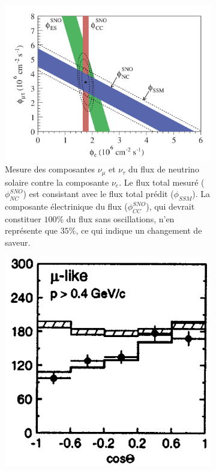             \begin{figure}[htbp]
                \begin{subfigure}[t]{0.56\textwidth}
                    \includegraphics[width=\textwidth]{Chapitre_1/pictures/SNO_plot.png}
                    \caption{Mesure des composantes $\nu_{\mu}$ et $\nu_{\tau}$ du flux de neutrino solaire contre la composante $\nu_e$\cite{Aharmim2013}. Le flux total mesuré ($\phi_{NC}^{SNO}$) est consistant avec le flux total prédit ($\phi_{SSM}$). La composante électrinique du flux ($\phi_{CC}^{SNO}$), qui devrait constituer $100\%$ du flux sans oscillations, n'en représente que $35\%$, ce qui indique un changement de saveur.}
                    \label{fig::SNO_plot}
                \end{subfigure}
                \hfill 
                \begin{subfigure}[t]{0.4\textwidth}
                    \includegraphics[width=\textwidth]{Chapitre_1/pictures/superK_plot.png}

\end{subfigure}
\end{figure}
